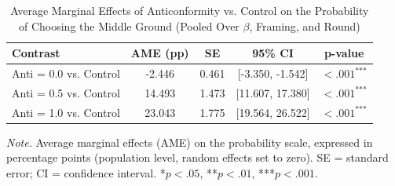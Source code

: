 \begin{table}[H]
\centering
\caption{Average Marginal Effects of Anticonformity vs. Control on the Probability of Choosing the Middle Ground (Pooled Over $\beta$, Framing, and Round)}
\label{tab:ame_anti_pooled}
\begingroup
\footnotesize
\renewcommand{\arraystretch}{0.90}

\begin{tabularx}{\linewidth}{Xcccc}
\toprule
\textbf{Contrast} & \textbf{AME (pp)} & \textbf{SE} & \textbf{95\% CI} & \textbf{p-value} \\
\midrule
Anti = 0.0 vs. Control & -2.446 & 0.461 & [-3.350, -1.542] & $< .001^{\text{***}}$ \\
Anti = 0.5 vs. Control & 14.493 & 1.473 & [11.607, 17.380] & $< .001^{\text{***}}$ \\
Anti = 1.0 vs. Control & 23.043 & 1.775 & [19.564, 26.522] & $< .001^{\text{***}}$ \\
\bottomrule
\end{tabularx}

\vspace{0.6em}
{\footnotesize
\setlength{\baselineskip}{12pt}
\textit{Note.} Average marginal effects (AME) on the probability scale, expressed in percentage points (population level, random effects set to zero). SE = standard error; CI = confidence interval. *$p < .05$, **$p < .01$, ***$p < .001$.
\par}
\endgroup
\end{table}
